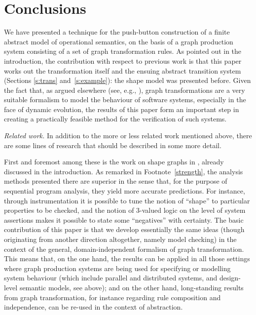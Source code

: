 \section{Conclusions}

We have presented a technique for the push-button construction of a finite
abstract model of operational semantics, on the basis of a graph production
system consisting of a set of graph transformation rules. As pointed out in the
introduction, the contribution with respect to previous work is that this paper
works out the transformation itself and the ensuing abstract transition system
(Sections \ref{s:trans} and~\ref{s:example}): the shape model was presented
before. Given the fact that, as argued elsewhere (see, e.g.,
\cite{Corr+04,DepHecKue02,Dott+03,Kusk+02}), graph transformations are a very
suitable formalism to model the behaviour of software systems, especially in the
face of dynamic evolution, the results of this paper form an important step in
creating a practically feasible method for the verification of such systems.

\medskip\noindent\textit{Related work.}
%
In addition to the more or less related work mentioned above, there are some
lines of research that should be described in some more detail.

First and foremost among these is the work on shape graphs in
\cite{SagRepWil98,SagRepWil02}, already discussed in the introduction. As
remarked in Footnote~\ref{strength}, the analysis methods presented there are
superior in the sense that, for the purpose of sequential program analysis,
they yield more accurate predictions. For instance, through instrumentation it
is possible to tune the notion of ``shape'' to particular properties to be
checked, and the notion of 3-valued logic on the level of system assertions
makes it possible to state some ``negatives'' with certainty. The basic
contribution of this paper is that we develop essentially the same ideas
(though originating from another direction altogether, namely model checking)
in the context of the general, domain-independent formalism of graph
transformation. This means that, on the one hand, the results can be applied in
all those settings where graph production systems are being used for specifying
or modelling system behaviour (which include parallel and distributed systems,
and design-level semantic models, see above); and on the other hand,
long-standing results from graph transformation, for instance regarding rule
composition and independence, can be re-used in the context of abstraction.

